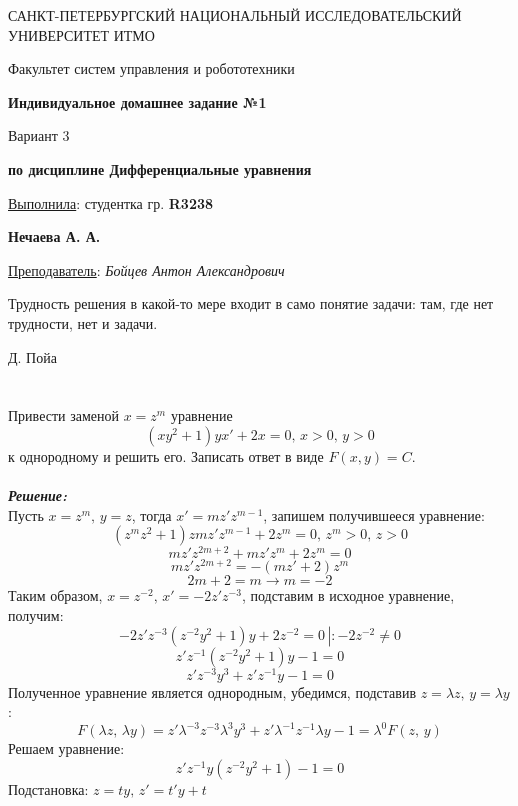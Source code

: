 \documentclass[a5paper, 10pt]{article}
\theoremstyle{definition}
\theoremstyle{plain}
\theoremstyle{remark}
\newcommand*{\titlePage}{
	\thispagestyle{title}
	\begingroup
	\begin{center}
		\vspace*{6ex}
		
		{\small
			САНКТ-ПЕТЕРБУРГСКИЙ НАЦИОНАЛЬНЫЙ ИССЛЕДОВАТЕЛЬСКИЙ УНИВЕРСИТЕТ ИТМО	
		}
		
		\vspace*{2ex}
		
		{\normalsize
			Факультет систем управления и робототехники
		}
		
		\vspace*{15ex}
		
		{\Large \bfseries 
			Индивидуальное домашнее задание №1
		}
\vspace*{3ex}
		
		{ \Large 
			Вариант 3
		}
\vspace*{3ex}
		
		{  \bfseries 
			по дисциплине Дифференциальные уравнения
		}
	\end{center}
	\vspace*{20ex}
	\begin{flushright}
		{\large 
			\underline{Выполнила}: студентка гр. \textbf{R3238}\\
			\begin{flushright}
				\textbf{Нечаева А. А.}\\
			\end{flushright}
		}
		
		\vspace*{5ex}
		
		{\large 
			\underline{Преподаватель}: \textit{Бойцев Антон Александрович}
		}
	\end{flushright}	
	\newpage
	\setcounter{page}{1}
	\endgroup}
\begin{document}
	\titlePage
	\pagestyle{style}
	
\newpage
\epigraph{Трудность решения в какой-то мере входит в само понятие задачи: там, где нет трудности, нет и задачи.}{Д. Пойа}

\section{}
Привести заменой $x=z^m$ уравнение 
\begin{equation*}
(xy^2+1)yx' + 2x = 0, \, x > 0, \, y > 0
\end{equation*}
к однородному и решить его. Записать ответ в виде $F(x, y) = C$.\\
\\
\textit{\textbf{Решение:}}\\
Пусть $x=z^m, \, y = z$, тогда $x'=mz'z^{m-1}$, запишем получившееся уравнение:
\begin{equation*}
(z^mz^2+1)zmz'z^{m-1} + 2z^m = 0, \, z^m > 0, \, z > 0
\end{equation*}
\begin{equation*}
mz'z^{2m+2}+mz'z^{m} + 2z^m = 0
\end{equation*}
\begin{equation*}
mz'z^{2m+2}= -(mz' + 2)z^m
\end{equation*}
\begin{equation*}
2m+2 = m \to m = -2
\end{equation*}
Таким образом, $x = z^{-2}, \, x' = -2z' z^{-3}$, подставим в исходное уравнение, получим:
\begin{equation*}
-2z' z^{-3}( z^{-2}y^2+1)y + 2 z^{-2} = 0 \, \left| \right. : -2z^{-2} \neq 0
\end{equation*}
\begin{equation*}
z' z^{-1}( z^{-2}y^2+1)y -1 = 0 
\end{equation*}
\begin{equation*}
z' z^{-3}y^3+ z' z^{-1}y -1 = 0 
\end{equation*}
Полученное уравнение является однородным, убедимся, подставив $z = \lambda z, \, y = \lambda y$:
\begin{equation*}
 F( \lambda z,\, \lambda y ) = z' \lambda^{-3} z^{-3} \lambda^3y^3+ z' \lambda^{-1}z^{-1} \lambda y -1 =  \lambda^0  F(  z,\,  y )
\end{equation*}
Решаем уравнение:
\begin{equation*}
z'  z^{-1}y(z^{-2}y^2+ 1) -1 = 0 
\end{equation*}
Подстановка: $z = ty, \, z' = t'y + t$
\end{document}
